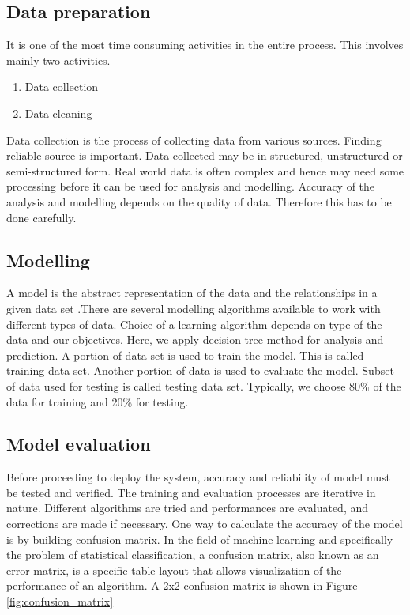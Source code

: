 \subsection{Data preparation}
It is one of the most time consuming activities in the entire process. This involves mainly two activities. 
\begin{enumerate}
    \item Data collection 
    \item Data cleaning
\end{enumerate}
Data collection is the process of collecting data from various sources. Finding reliable source is important. Data collected may be in structured, unstructured or semi-structured form. Real world data is often complex and hence may need some processing before it can be used for analysis and modelling. Accuracy of the analysis and modelling depends on the quality of data. Therefore this has to be done carefully. 

\subsection{Modelling}
A model is the abstract representation of the data and the relationships in a given data set \cite{kotu_data_2019}.There are several modelling algorithms available to work with different types of data. Choice of a learning algorithm depends on type of the data and our objectives. Here, we apply decision tree method for analysis and prediction. A portion of data set is used to train the model. This is called training data set. Another portion of data is used to evaluate the model. Subset of data used for testing is called testing data set. Typically, we choose 80\% of the data for training and 20\% for testing. 

\subsection{Model evaluation}
Before proceeding to deploy the system, accuracy and reliability of model must be tested and verified. The training and evaluation processes are iterative in nature. Different algorithms are tried and performances are evaluated, and corrections are made if necessary. One way to calculate the accuracy of the model is by building confusion matrix. In the field of machine learning and specifically the problem of statistical classification, a confusion matrix, also known as an error matrix,\cite{stehman_selecting_1997} is a specific table layout that allows visualization of the performance of an algorithm. A 2x2 confusion matrix is shown in Figure \ref{fig:confusion_matrix}

